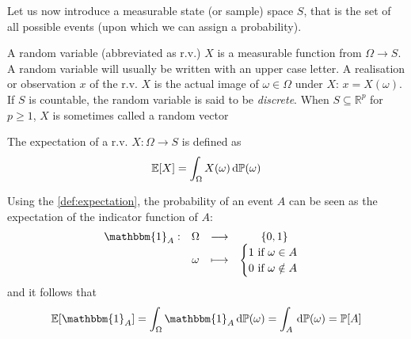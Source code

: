 \documentclass[../../Main_ManuscritThese.tex]{subfiles}
\begin{document}
Let us now introduce a measurable state (or sample) space $S$, that is the set of all possible events (upon which we can assign a probability).
\begin{definition}
  \label{def:random_variable}
  A random variable (abbreviated as r.v.) $X$ is a measurable function from $\Omega \longrightarrow S$. A random variable will usually be written with an upper case letter. A realisation or observation $x$ of the r.v. $X$ is the actual image of $\omega\in\Omega$ under $X$: $x = X(\omega)$. If $S$ is countable, the random variable is said to be \emph{discrete}. When $S\subseteq \mathbb{R}^p$ for $p\geq 1$, $X$ is sometimes called a random vector
  
  \label{def:expectation}
  The expectation of a r.v. $X:\Omega \rightarrow S$ is defined as
  \begin{equation}
    \mathbb{E}[X] = \int_{\Omega} X(\omega) \,\mathrm{d}\mathbb{P}(\omega)
  \end{equation}
\end{definition}

  Using the \cref{def:expectation}, the probability of an event $A$ can be seen as the expectation of the indicator function of $A$:
  \begin{equation}
    \begin{array}{cccc}
      \mathbbm{1}_{A}:& \Omega& \longrightarrow& \{0,1\} \\
                      & \omega& \longmapsto & \begin{cases}
                        1\text{ if } \omega \in A \\
                        0 \text{ if } \omega \notin A
                                              \end{cases}
    \end{array}
  \end{equation}
  and it follows that
  \begin{equation}
    \Ex[\mathbbm{1}_A] = \int_{\Omega} \mathbbm{1}_A \, \mathrm{d}\Prob(\omega)= \int_{A} \, \mathrm{d}\Prob(\omega) = \Prob[A]
  \end{equation}
\end{document}
